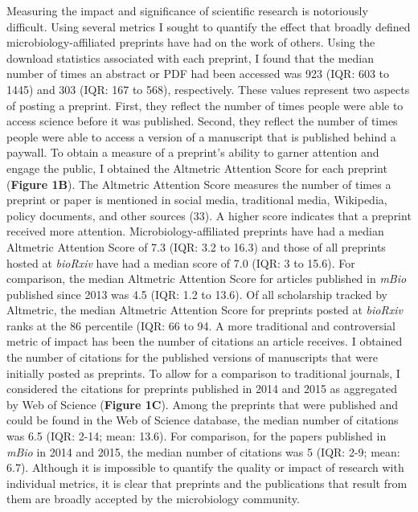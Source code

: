 \documentclass[11pt,]{article}
\begin{document}
Measuring the impact and significance of scientific research is
notoriously difficult. Using several metrics I sought to quantify the
effect that broadly defined microbiology-affiliated preprints have had
on the work of others. Using the download statistics associated with
each preprint, I found that the median number of times an abstract or
PDF had been accessed was 923 (IQR: 603 to 1445) and 303 (IQR: 167 to
568), respectively. These values represent two aspects of posting a
preprint. First, they reflect the number of times people were able to
access science before it was published. Second, they reflect the number
of times people were able to access a version of a manuscript that is
published behind a paywall. To obtain a measure of a preprint's ability
to garner attention and engage the public, I obtained the Altmetric
Attention Score for each preprint (\textbf{Figure 1B}). The Altmetric
Attention Score measures the number of times a preprint or paper is
mentioned in social media, traditional media, Wikipedia, policy
documents, and other sources (33). A higher score indicates that a
preprint received more attention. Microbiology-affiliated preprints have
had a median Altmetric Attention Score of 7.3 (IQR: 3.2 to 16.3) and
those of all preprints hosted at \emph{bioRxiv} have had a median score
of 7.0 (IQR: 3 to 15.6). For comparison, the median Altmetric Attention
Score for articles published in \emph{mBio} published since 2013 was 4.5
(IQR: 1.2 to 13.6). Of all scholarship tracked by Altmetric, the median
Altmetric Attention Score for preprints posted at \emph{bioRxiv} ranks
at the 86 percentile (IQR: 66 to 94. A more traditional and
controversial metric of impact has been the number of citations an
article receives. I obtained the number of citations for the published
versions of manuscripts that were initially posted as preprints. To
allow for a comparison to traditional journals, I considered the
citations for preprints published in 2014 and 2015 as aggregated by Web
of Science (\textbf{Figure 1C}). Among the preprints that were published
and could be found in the Web of Science database, the median number of
citations was 6.5 (IQR: 2-14; mean: 13.6). For comparison, for the
papers published in \emph{mBio} in 2014 and 2015, the median number of
citations was 5 (IQR: 2-9; mean: 6.7). Although it is impossible to
quantify the quality or impact of research with individual metrics, it
is clear that preprints and the publications that result from them are
broadly accepted by the microbiology community.
\end{document}
